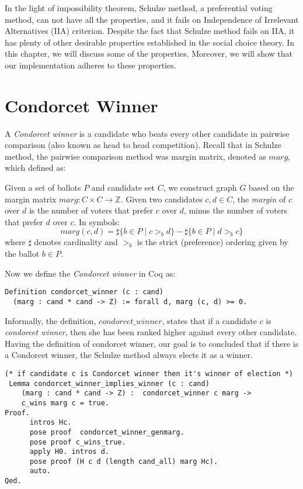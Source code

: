  In the light of impossibility theorem, Schulze method, a preferential voting method, can not have all the properties, and it fails on 
 Independence of Irrelevant Alternatives (IIA) criterion. Despite the fact that Schulze method fails on IIA,  it has plenty of other desirable
 properties established in the social choice theory. In this chapter, we will discuss some of 
 the properties.  Moreover, we will show that our implementation adheres to these properties. 
 
 \section{Condorcet Winner}
	A \textit{Condorcet winner} is a candidate who beats every other candidate in pairwise comparison (also known as head to head competition). 
	Recall that in Schulze method, the pairwise comparison method was margin matrix, denoted as $marg$, which defined as:
	\begin{displayquote}
	Given a set of ballots $P$ and candidate set $C$, we construct graph $G$ based on the margin matrix $marg: C \times C \to \mathbb{Z}$. Given two candidates $c, d \in C$,
the \emph{margin} of $c$ over $d$ is
the number of voters that prefer $c$ over $d$, minus the number of voters that prefer $d$ over $c$. 
In symbols:
\[
  marg(c, d) = \sharp \lbrace b \in P \mid c >_b d \rbrace -
            \sharp \lbrace b \in P \mid d >_b c \rbrace
\] where $\sharp$ denotes cardinality and $>_b$ is the strict
(preference) ordering given by the ballot $b \in P$.
 
 \end{displayquote}
  
\noindent	 
Now we define the \textit{Condorcet winner} in Coq as:
 \begin{verbatim}
Definition condorcet_winner (c : cand) 
  (marg : cand * cand -> Z) := forall d, marg (c, d) >= 0.
\end{verbatim}

  Informally, the definition,  $condorcet\_winner$, states that 
  if a candidate $c$  is \textit{condorcet winner}, then she has been ranked higher against
  every other candidate.  Having the definition of  condorcet winner, our goal is to concluded that if there is 
 	a Condorcet winner, the Schulze method always elects it as a winner.  
 	
\begin{verbatim}
(* if candidate c is Condorcet winner then it's winner of election *)
 Lemma condorcet_winner_implies_winner (c : cand) 
    (marg : cand * cand -> Z) :  condorcet_winner c marg ->
    c_wins marg c = true. 
Proof.
      intros Hc. 
      pose proof  condorcet_winner_genmarg.
      pose proof c_wins_true.
      apply H0. intros d.
      pose proof (H c d (length cand_all) marg Hc).
      auto.
Qed.
\end{verbatim}
 		
